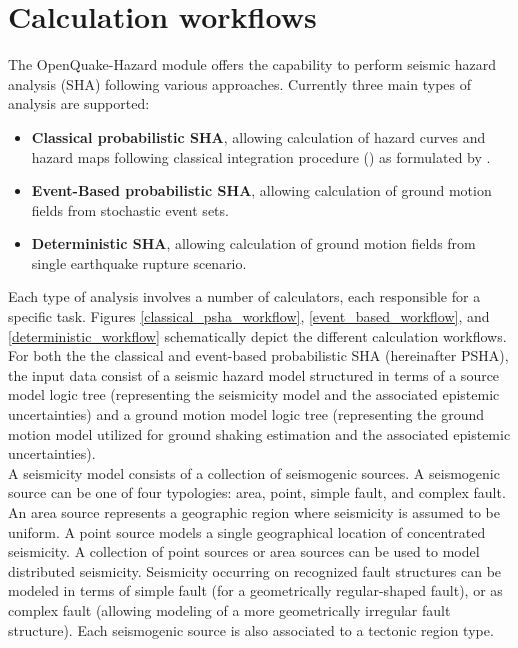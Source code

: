 \section{Calculation workflows}
The OpenQuake-Hazard module offers the capability to perform seismic hazard 
analysis (SHA) following various approaches. Currently three main types of 
analysis are supported:
\begin{itemize}
\item \textbf{Classical probabilistic SHA}, allowing calculation of hazard 
curves and hazard maps following classical integration procedure 
(\cite{cornell1968}) as formulated by \cite{field2003}.
\item \textbf{Event-Based probabilistic SHA}, allowing calculation of ground 
motion fields from stochastic event sets.
\item \textbf{Deterministic SHA}, allowing calculation of ground motion fields 
from single earthquake rupture scenario.
\end{itemize}
Each type of analysis involves a number of calculators, each responsible for 
a specific task. Figures \ref{classical_psha_workflow}, 
\ref{event_based_workflow}, and \ref{deterministic_workflow} 
schematically depict the different calculation workflows. \\
For both the the classical and event-based probabilistic SHA 
(hereinafter PSHA), the input data consist of a seismic hazard model structured 
in terms of a source model logic tree (representing the seismicity model and 
the associated epistemic uncertainties) and a ground motion model logic tree 
(representing the ground motion model utilized for ground shaking estimation 
and the associated epistemic uncertainties).\\
A seismicity model consists of a collection of seismogenic sources. 
A seismogenic source can be one of four typologies: area, point, simple fault, 
and complex fault. An area source represents a geographic region where 
seismicity is assumed to be uniform. A point source models a single 
geographical location of concentrated seismicity. A collection of point sources 
or area sources can be used to model distributed seismicity. 
Seismicity occurring on recognized fault structures can be modeled in terms of 
simple fault (for a geometrically regular-shaped fault), or as complex fault 
(allowing modeling of a more geometrically irregular fault structure). 
Each seismogenic source is also associated to a tectonic region type.\\
